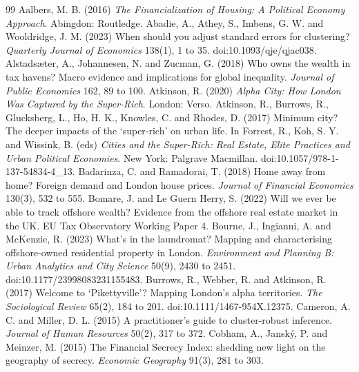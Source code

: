 \documentclass[11pt,a4paper]{article}
\begin{document}
\begin{thebibliography}{99}
 Aalbers, M. B. (2016) \textit{The Financialization of Housing: A Political Economy Approach}. Abingdon: Routledge.
 Abadie, A., Athey, S., Imbens, G. W. and Wooldridge, J. M. (2023) When should you adjust standard errors for clustering? \textit{Quarterly Journal of Economics} 138(1), 1 to 35. doi:10.1093/qje/qjac038.
 Alstads{\ae}ter, A., Johannesen, N. and Zucman, G. (2018) Who owns the wealth in tax havens? Macro evidence and implications for global inequality. \textit{Journal of Public Economics} 162, 89 to 100.
 Atkinson, R. (2020) \textit{Alpha City: How London Was Captured by the Super-Rich}. London: Verso.
 Atkinson, R., Burrows, R., Glucksberg, L., Ho, H. K., Knowles, C. and Rhodes, D. (2017) Minimum city? The deeper impacts of the `super-rich' on urban life. In Forrest, R., Koh, S. Y. and Wissink, B. (eds) \textit{Cities and the Super-Rich: Real Estate, Elite Practices and Urban Political Economies}. New York: Palgrave Macmillan. doi:10.1057/978-1-137-54834-4\_13.
 Badarinza, C. and Ramadorai, T. (2018) Home away from home? Foreign demand and London house prices. \textit{Journal of Financial Economics} 130(3), 532 to 555.
 Bomare, J. and Le Guern Herry, S. (2022) Will we ever be able to track offshore wealth? Evidence from the offshore real estate market in the UK. EU Tax Observatory Working Paper 4.
 Bourne, J., Ingianni, A. and McKenzie, R. (2023) What's in the laundromat? Mapping and characterising offshore-owned residential property in London. \textit{Environment and Planning B: Urban Analytics and City Science} 50(9), 2430 to 2451. doi:10.1177/23998083231155483.
 Burrows, R., Webber, R. and Atkinson, R. (2017) Welcome to `Pikettyville'? Mapping London's alpha territories. \textit{The Sociological Review} 65(2), 184 to 201. doi:10.1111/1467-954X.12375.
 Cameron, A. C. and Miller, D. L. (2015) A practitioner's guide to cluster-robust inference. \textit{Journal of Human Resources} 50(2), 317 to 372.
 Cobham, A., Jansk\'y, P. and Meinzer, M. (2015) The Financial Secrecy Index: shedding new light on the geography of secrecy. \textit{Economic Geography} 91(3), 281 to 303.

\end{thebibliography}
\end{document}
